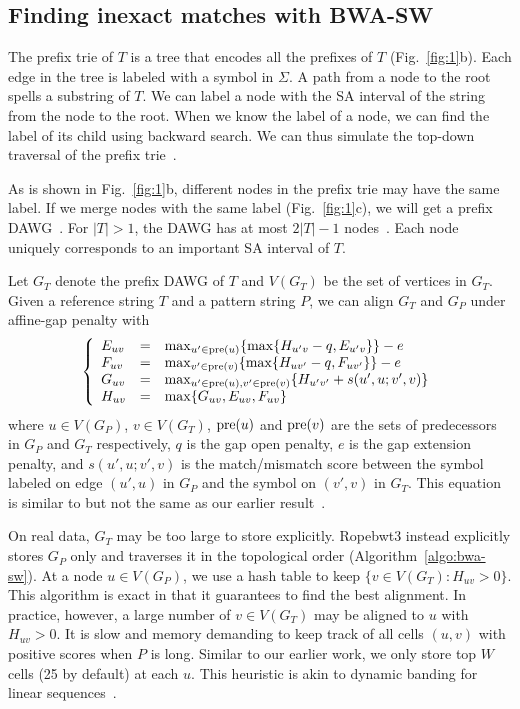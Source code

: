 \documentclass[webpdf,contemporary,large,namedate]{oup-authoring-template}%
\begin{document}
\subsection{Finding inexact matches with BWA-SW}

The prefix trie of $T$ is a tree that encodes all the prefixes of $T$ (Fig.~\ref{fig:1}b).
Each edge in the tree is labeled with a symbol in $\Sigma$.
A path from a node to the root spells a substring of $T$.
We can label a node with the SA interval of the string from the node to the root.
When we know the label of a node, we can find the label of its child using backward search.
We can thus simulate the top-down traversal of the prefix trie~\citep{Lam:2008aa}.

As is shown in Fig.~\ref{fig:1}b, different nodes in the prefix trie may have the same label.
If we merge nodes with the same label (Fig.~\ref{fig:1}c), we will get a prefix DAWG~\citep{DBLP:journals/eatcs/BlumerBEHM83}.
For $|T|>1$, the DAWG has at most $2|T|-1$ nodes~\citep{DBLP:conf/icalp/BlumerBEHM84}.
Each node uniquely corresponds to an important SA interval of $T$.

Let $G_T$ denote the prefix DAWG of $T$ and $V(G_T)$ be the set of vertices in $G_T$.
Given a reference string $T$ and a pattern string $P$, we can align $G_T$ and $G_P$ under affine-gap penalty with
$$
\left\{\begin{array}{lll}
E_{uv}&=&\max_{u'\in{\rm pre}(u)}\{\max\{H_{u'v}-q,E_{u'v}\}\}-e\\
F_{uv}&=&\max_{v'\in{\rm pre}(v)}\{\max\{H_{uv'}-q,F_{uv'}\}\}-e\\
G_{uv}&=&\max_{u'\in{\rm pre}(u),v'\in{\rm pre}(v)}\{H_{u'v'}+s(u',u;v',v)\}\\
H_{uv}&=&\max\{G_{uv},E_{uv},F_{uv}\}\\
\end{array}\right.
$$
where $u\in V(G_P)$, $v\in V(G_T)$,
${\rm pre}(u)$ and ${\rm pre}(v)$ are the sets of predecessors in $G_P$ and $G_T$ respectively,
$q$ is the gap open penalty, $e$ is the gap extension penalty,
and $s(u',u;v',v)$ is the match/mismatch score between the symbol labeled on edge $(u',u)$ in $G_P$
and the symbol on $(v',v)$ in $G_T$.
This equation is similar to but not the same as our earlier result~\citep{Li:2010fk}.

On real data, $G_T$ may be too large to store explicitly.
Ropebwt3 instead explicitly stores $G_P$ only and traverses it in the topological order (Algorithm~\ref{algo:bwa-sw}).
At a node $u\in V(G_P)$, we use a hash table to keep $\{v\in V(G_T):H_{uv}>0\}$.
This algorithm is exact in that it guarantees to find the best alignment.
In practice, however, a large number of $v\in V(G_T)$ may be aligned to $u$ with $H_{uv}>0$.
It is slow and memory demanding to keep track of all cells $(u,v)$ with positive scores when $P$ is long.
Similar to our earlier work, we only store top $W$ cells (25 by default) at each $u$.
This heuristic is akin to dynamic banding for linear sequences~\citep{Suzuki:2018aa}.
\end{document}
